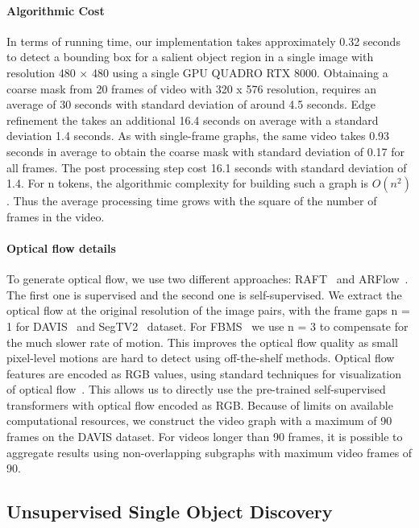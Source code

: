 \documentclass[twocolumn]{article}
\begin{document}
\paragraph*{Algorithmic Cost}
In terms of running time, our implementation takes approximately 0.32 seconds to detect a bounding box for a salient object region in a single image with resolution 480 $\times$ 480 using a single GPU QUADRO RTX 8000. Obtainaing a coarse mask from 20 frames of video with 320 x 576 resolution, requires an average of 30 seconds with standard deviation of around 4.5 seconds. 
Edge refinement the takes an additional 16.4 seconds on average with a standard deviation 1.4 seconds. As with single-frame graphs, the same video takes 0.93 seconds in average to obtain the coarse mask with standard deviation of 0.17 for all frames. The post processing step cost 16.1 seconds with standard deviation of 1.4.   For n tokens, the algorithmic complexity for building such a graph  is $O(n^2)$. Thus the average processing time grows with the square of the number of frames in the video.

\paragraph*{Optical flow details}
To generate optical flow, we use two different approaches: RAFT~\cite{teed2020raft} and ARFlow~\cite{liu2020learning}. The first one is supervised and the second one is self-supervised. We extract the optical ﬂow at the original resolution of the image pairs, with the frame gaps n = 1 for DAVIS~\cite{perazzi2016benchmark} and SegTV2~\cite{li2013video} dataset. For FBMS~\cite{ochs2013segmentation} we use n = 3 to compensate for the much slower rate of motion. This improves the optical flow quality as small pixel-level motions are hard to detect using off-the-shelf methods. Optical flow features are encoded as RGB values, using standard techniques for visualization of optical flow~\cite{baker2011database}. This allows us to directly use the pre-trained self-supervised transformers with optical flow encoded as RGB. 
Because of limits on available  computational resources, we construct the video graph with a maximum of 90 frames on the DAVIS dataset. For videos longer than 90 frames, it is possible to aggregate results using non-overlapping subgraphs with maximum video frames of 90. 

\subsection{Unsupervised Single Object Discovery}
\label{sec:unsupervised_object_discovery}
\end{document}
